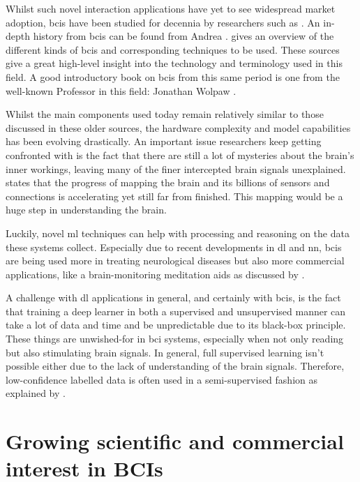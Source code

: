 Whilst such novel interaction applications have yet to see widespread market adoption, \glspl{bci} have been studied for decennia by researchers such as \citet{early_bci}.
An in-depth history from \glspl{bci} can be found from Andrea \citet{bci_history}.
\citet{bci_review} gives an overview of the different kinds of \glspl{bci} and corresponding techniques to be used.
These sources give a great high-level insight into the technology and terminology used in this field.
A good introductory book on \glspl{bci} from this same period is one from the well-known Professor in this field: Jonathan Wolpaw \citep{bci_book}.

Whilst the main components used today remain relatively similar to those discussed in these older sources, the hardware complexity and model capabilities has been evolving drastically.
An important issue researchers keep getting confronted with is the fact that there are still a lot of mysteries about the brain's inner workings, leaving many of the finer intercepted brain signals unexplained.
\citet{brainmapping} states that the progress of mapping the brain and its billions of sensors and connections is accelerating yet still far from finished.
This mapping would be a huge step in understanding the brain.

Luckily, novel \gls{ml} techniques can help with processing and reasoning on the data these systems collect.
Especially due to recent developments in \gls{dl} and \gls{nn}, \glspl{bci} are being used more in treating neurological diseases \citep{bci_diseases} but also more commercial applications, like a brain-monitoring meditation aids as discussed by \citet{interaxon_tests}.

A challenge with \gls{dl} applications in general, and certainly with \glspl{bci}, is the fact that training a deep learner in both a supervised and unsupervised manner can take a lot of data and time and be unpredictable due to its black-box principle.
These things are unwished-for in \gls{bci} systems, especially when not only reading but also stimulating brain signals.
In general, full supervised learning isn't possible either due to the lack of understanding of the brain signals.
Therefore, low-confidence labelled data is often used in a semi-supervised fashion as explained by \citet{deep_learn_low_label}.


\section{Growing scientific and commercial interest in BCIs}
\label{sec:bci_gaining_popularity}

